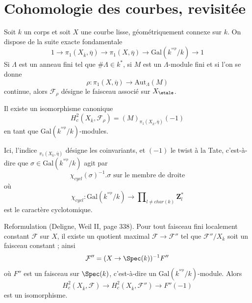 \section{Cohomologie des courbes, revisitée}
\label{section-cohomology-curves-revisited}

\noindent
Soit $k$ un corps et soit $X$ une courbe lisse, géométriquement connexe sur $k$.
On dispose de la suite exacte fondamentale
$$
1 \to
\pi_1(X_{\overline{k}}, \overline \eta) \to
\pi_1(X, \overline\eta) \to
\text{Gal}(k^{^{sep}}/k) \to 1
$$
Si $\Lambda$ est un anneau fini tel que $\#\Lambda\in k^*$, si $M$ est un
$\Lambda$-module fini et si l'on se donne
$$
\rho : \pi_1(X, \overline\eta) \to \text{Aut}_{\Lambda}(M)
$$
continue, alors $\mathcal{F}_\rho$ désigne le faisceau associé sur
$X_\etale$.

\begin{lemma}
\label{lemma-identify-h2c}
Il existe un isomorphisme canonique
$$
H_c^2(X_{\overline{k}}, \mathcal{F}_\rho)=(M)_{\pi_1(X_{\overline{k}},
\overline\eta)}(-1)
$$
en tant que $\text{Gal}(k^{^{sep}}/k)$-modules.
\end{lemma}

\noindent
Ici, l'indice ${}_{\pi_1(X_{\overline{k}}, \overline\eta)}$
désigne les coinvariants, et $(-1)$ le twist à la Tate, c'est-à-dire que
$\sigma\in \text{Gal}(k^{^{sep}}/k)$ agit par
$$
\chi_{cycl}(\sigma)^{-1}.\sigma\text{ sur le membre de droite}
$$
où
$$
\chi_{cycl} :
\text{Gal}(k^{^{sep}}/k)
\to
\prod\nolimits_{l\neq char(k)}\mathbf{Z}_l^*
$$
est le caractère cyclotomique.

\medskip\noindent
Reformulation (Deligne, Weil II, page 338). Pour tout faisceau fini localement
constant $\mathcal{F}$ sur $X$, il existe un quotient maximal $\mathcal{F}\to
\mathcal{F}''$ tel que $\mathcal{F}''/X_{\overline{k}}$ soit un faisceau constant ; ainsi
$$
\mathcal{F}'' = (X\to \Spec(k))^{-1}F''
$$
où $F''$ est un faisceau sur $\Spec(k)$, c'est-à-dire un
$\text{Gal}(k^{^{sep}}/k)$-module. Alors
$$
H_c^2(X_{\overline{k}}, \mathcal{F})\to H_c^2(X_{\overline{k}},
\mathcal{F}'')\to F''(-1)
$$
est un isomorphisme.

